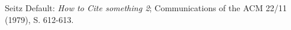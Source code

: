         Seitz Default: {\sl How to Cite something 2}; 
        Communications of the ACM 22/11 (1979), S. 612-613.
